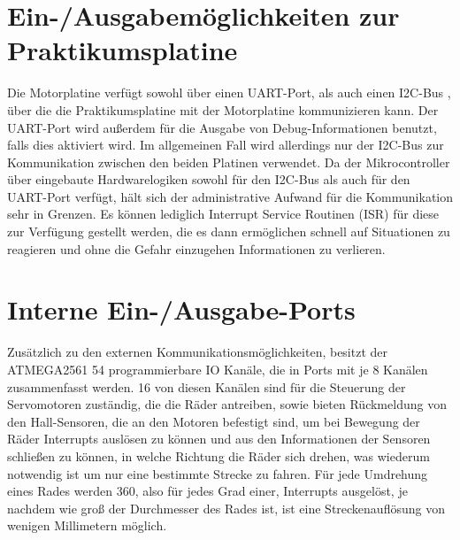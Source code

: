 \section{Ein-/Ausgabemöglichkeiten zur Praktikumsplatine}
Die Motorplatine verfügt sowohl über einen UART-Port, als auch einen I2C-Bus \cite{I2C_WIKI}, über die
die Praktikumsplatine mit der Motorplatine kommunizieren kann. Der UART-Port wird außerdem
für die Ausgabe von Debug-Informationen benutzt, falls dies aktiviert wird. Im allgemeinen
Fall wird allerdings nur der I2C-Bus zur Kommunikation zwischen den beiden Platinen verwendet.
Da der Mikrocontroller über eingebaute Hardwarelogiken sowohl für den I2C-Bus als auch für
den UART-Port verfügt, hält sich der administrative Aufwand für die Kommunikation sehr in
Grenzen. Es können lediglich Interrupt Service Routinen (ISR) für diese zur Verfügung gestellt
werden, die es dann ermöglichen schnell auf Situationen zu reagieren und ohne die Gefahr
einzugehen Informationen zu verlieren.
\section{Interne Ein-/Ausgabe-Ports}
Zusätzlich zu den externen Kommunikationsmöglichkeiten, besitzt der ATMEGA2561 54
programmierbare IO Kanäle, die in Ports mit je 8 Kanälen zusammenfasst werden. 16 von diesen
Kanälen sind für die Steuerung der Servomotoren zuständig, die die Räder antreiben, sowie bieten
Rückmeldung von den Hall-Sensoren, die an den Motoren befestigt sind, um bei Bewegung der Räder
Interrupts auslösen zu können und aus den Informationen der Sensoren schließen zu können, in welche
Richtung die Räder sich drehen, was wiederum notwendig ist um nur eine bestimmte Strecke zu fahren.
Für jede Umdrehung eines Rades werden 360, also für jedes Grad einer, Interrupts ausgelöst, je
nachdem wie groß der Durchmesser des Rades ist, ist eine Streckenauflösung von wenigen Millimetern
möglich.
